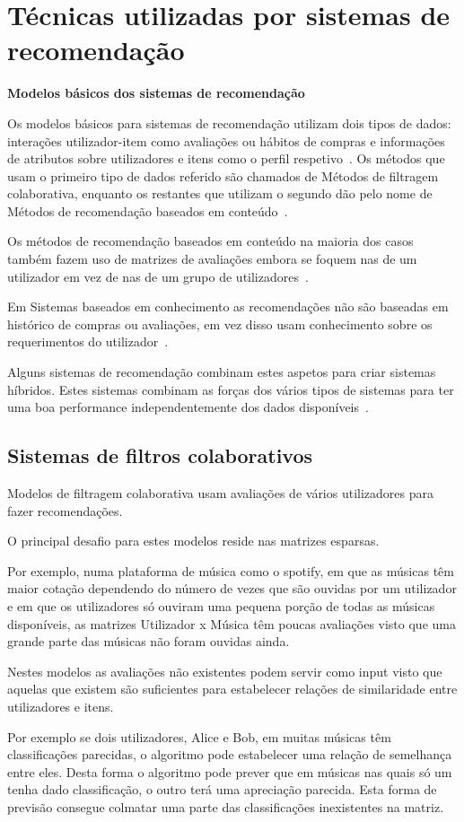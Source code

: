 \section{Técnicas utilizadas por sistemas de recomendação}

\begin{center}
\normalsize{\bfseries Modelos básicos dos sistemas de recomendação}\hfill
\end{center}


\par Os modelos básicos para sistemas de recomendação utilizam dois tipos de dados: interações utilizador-item como avaliações ou hábitos de compras e informações de atributos sobre utilizadores e itens como o perfil respetivo~\cite{ref_book1}. Os métodos que usam o primeiro tipo de dados referido são chamados de Métodos de filtragem colaborativa, enquanto os restantes que utilizam o segundo dão pelo nome de Métodos de recomendação baseados em conteúdo~\cite{ref_book1}.
\par Os métodos de recomendação baseados em conteúdo na maioria dos casos também fazem uso de matrizes de avaliações embora se foquem nas de um utilizador em vez de nas de um grupo de utilizadores~\cite{ref_book1}.
\par Em Sistemas baseados em conhecimento as recomendações não são baseadas em histórico de compras ou avaliações, em vez disso usam conhecimento sobre os requerimentos do utilizador~\cite{ref_book1}.
\par Alguns sistemas de recomendação combinam estes aspetos para criar sistemas híbridos. Estes sistemas combinam as forças dos vários tipos de sistemas para ter uma boa performance independentemente dos dados disponíveis~\cite{ref_book1}.
\hfill
\subsection{Sistemas de filtros colaborativos}
\hfill
\par Modelos de filtragem colaborativa usam avaliações de vários utilizadores para fazer recomendações.
\par O principal desafio para estes modelos reside nas matrizes esparsas.
\par Por exemplo, numa plataforma de música como o spotify, em que as músicas têm maior cotação dependendo do número de vezes que são ouvidas por um utilizador e em que os utilizadores só ouviram uma pequena porção de todas as músicas disponíveis, as matrizes Utilizador x Música têm poucas avaliações visto que uma grande parte das músicas não foram ouvidas ainda.
\par Nestes modelos as avaliações não existentes podem servir como input visto que aquelas que existem são suficientes para estabelecer relações de similaridade entre utilizadores e itens.
\par Por exemplo se dois utilizadores, Alice e Bob, em muitas músicas têm classificações parecidas, o algoritmo pode estabelecer uma relação de semelhança entre eles. Desta forma o algoritmo pode prever que em músicas nas quais só um tenha dado classificação, o outro terá uma apreciação parecida. Esta forma de previsão consegue colmatar uma parte das classificações inexistentes na matriz.


